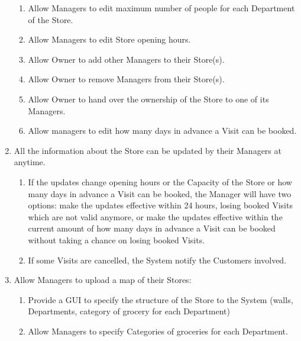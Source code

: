 \documentclass[a4paper, 12pt, oneside]{article}
\begin{document}
\begin{enumerate}[align=left, label={R.\arabic{*}}]
\begin{enumerate}[label={-}]
        \item \label{req:man:updateStoreInfo:maxPeoplePerDep}Allow Managers to edit maximum number of people for each Department of the Store.
        \item \label{req:man:updateStoreInfo:openingHours}Allow Managers to edit Store opening hours.
         \item \label{req:man:updateStoreInfo:addMan}Allow Owner to add other Managers to their Store(s).
        \item \label{req:man:updateStoreInfo:removeMan}Allow Owner to remove Managers from their Store(s).
        \item \label{req:man:updateStoreInfo:handOwnership}Allow Owner to hand over the ownership of the Store to one of its Managers.
        \item \label{req:man:updateStoreInfo:daysToBook}Allow managers to edit how many days in advance a Visit can be booked.
    \end{enumerate}
    
        \item \label{req:man:whenToUpdate}All the information about the Store can be updated by their Managers at anytime.
    \begin{enumerate}[label={-}]
        \item \label{req:man:whenToUpdate:whenEffective}If the updates change opening hours or the Capacity of the Store or how many days in advance a Visit can be booked, the Manager will have two options: make the updates effective within 24 hours, losing booked Visits which are not valid anymore, or make the updates effective within the current amount of how many days in advance a Visit can be booked without taking a chance on losing booked Visits.
        \item \label{req:man:whenToUpdate:lostVisits} If some Visits are cancelled, the System notify the Customers involved.
    \end{enumerate}
    
    \item \label{req:man:uploadMap}Allow Managers to upload a map of their Stores:
    \begin{enumerate}[label={-}]
        \item \label{req:man:uploadMap:GUI}Provide a GUI to specify the structure of the Store to the System (walls, Departments, category of grocery for each Department)
        \item \label{req:man:uploadMap:specCategories}Allow Managers to specify Categories of groceries for each Department.
    \end{enumerate}
    

\end{enumerate}
\end{document}
